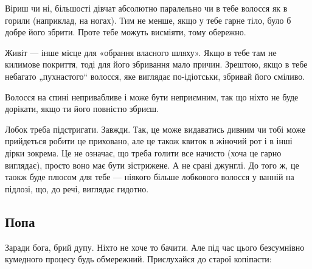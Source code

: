 Віриш чи ні, більшості дівчат абсолютно паралельно чи в тебе волосся як
в горили (наприклад, на ногах). Тим не менше, якщо у тебе гарне тіло, було б
добре його збрити. Проте тебе можуть висміяти, тому обережно.

Живіт — інше місце для «обрання власного шляху». Якщо в тебе там не килимове
покриття, тоді для його збривання мало причин. Зрештою, якщо в тебе небагато
„пухнастого“ волосся, яке виглядає по-ідіотськи, збривай його сміливо.

Волосся на спині непривабливе і може бути неприємним, так що ніхто не буде
дорікати, якщо ти його повністю збриєш.

Лобок треба підстригати. Завжди. Так, це може видаватись дивним чи тобі може
прийдеться робити це приховано, але це також квиток в жіночий рот і в інші
дірки зокрема. Це не означає, що треба голити все начисто (хоча це гарно
виглядає), просто воно має бути зістрижене. А не срані джунглі. До того ж, це
таокж буде плюсом для тебе — ніякого більше лобкового волосся у ванній на
підлозі, що, до речі, виглядає гидотно.

\subsection{Попа}
Заради бога, брий дупу. Ніхто не хоче то бачити. Але під час цього безсумнівно
кумедного процесу будь обмережний. Прислухайся до старої копіпасти:

